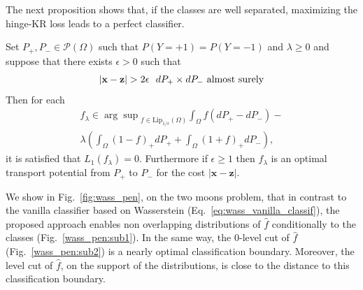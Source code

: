 The next proposition shows that, if the classes are well separated, maximizing the hinge-KR loss leads to a perfect classifier.%
\begin{Proposition}\label{coro:epsilon}
Set  $P_+, P_-\in \mathcal{P}(\Omega)$ such that $P(Y=+1)=P(Y=-1)$ and $\lambda\geq 0$ and suppose that there exists $\epsilon>0$ such that
\begin{align}\label{coro:hipotesis}
	| {\textbf{x}}-{\textbf{{{\textbf{z}}}}} |> 2 \epsilon \ \ dP_+\times dP_- \text{ almost surely}
\end{align}
Then for each
\begin{align*}
	f_{\lambda}\in {\arg\sup}_{f\in \text{Lip}_{1/\epsilon}(\Omega)}\int_{\Omega}f(dP_+-dP_-)-\\
	\lambda \left( \int_{\Omega}(1-f)_+dP_+ +\int_{\Omega}(1+f)_+dP_-\right),
\end{align*}
it is satisfied that $L_1(f_{\lambda})=0.$ Furthermore if $\epsilon\geq 1$ then $f_{\lambda}$ is an optimal transport potential from $P_+$ to $P_-$ for the cost $| {\textbf{x}}-{{\textbf{z}}}|$.
\end{Proposition}
We show in Fig.~\ref{fig:wass_pen}, on the two moons problem, that in contrast to the vanilla classifier based on Wasserstein (Eq.~\eqref{eq:wass_vanilla_classif}), the proposed approach enables non overlapping distributions of $\hat{f}$ conditionally to the classes (Fig.~\ref{wass_pen:sub1}).
In the same way, the 0-level cut of $\hat{f}$ (Fig.~\ref{wass_pen:sub2}) is a nearly optimal classification boundary. Moreover, the level cut of $\hat{f}$, on the support of the distributions, is close to the distance to this classification boundary.

